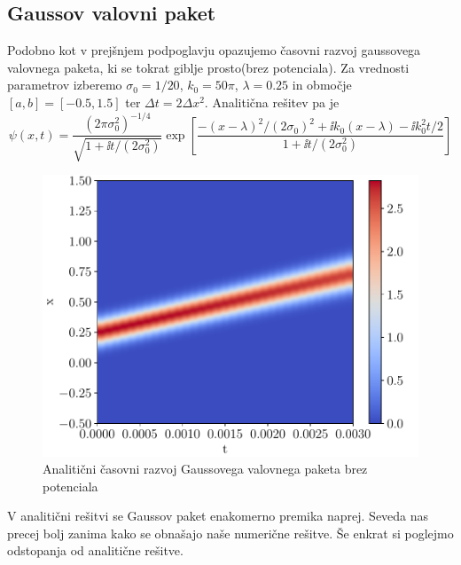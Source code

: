 \documentclass{article}
\begin{document}
\subsection{Gaussov valovni paket}
Podobno kot v prejšnjem podpoglavju opazujemo časovni razvoj gaussovega valovnega paketa, ki se tokrat giblje prosto(brez potenciala).
Za vrednosti parametrov izberemo $\sigma_0=1/20$, $k_0=50\pi$, $\lambda=0.25$ in območje $[a,b]=[-0.5,1.5]$ ter $\Delta t=2\Delta x^2$. Analitična rešitev pa je
\begin{equation*}
  \psi(x,t)=\frac{(2\pi \sigma_0^2)^{-1/4}}{\sqrt{1+\ii t/(2\sigma_0^2)}} \exp\left[
    \frac{-(x-\lambda)^2/(2\sigma_0)^2+\ii k_0(x-\lambda)-\ii k_0^2 t/2}{1+\ii t/(2\sigma_0^2)}
    \right]
\end{equation*}
\begin{figure}[H]
	\centering
	\includegraphics[width=0.7\linewidth]{analgauss.pdf}
	\caption{Analitični časovni razvoj Gaussovega valovnega paketa brez potenciala}
\end{figure}
V analitični rešitvi se Gaussov paket enakomerno premika naprej. Seveda nas precej bolj zanima kako se obnašajo naše numerične rešitve. Še enkrat si poglejmo odstopanja od analitične rešitve.
\end{document}
